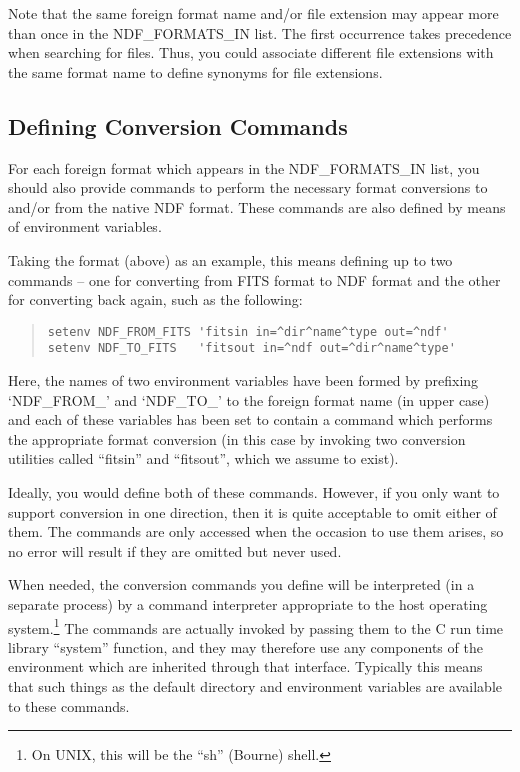 Note that the same foreign format name and/or file extension may
appear more than once in the NDF\_FORMATS\_IN list. The first
occurrence takes precedence when searching for files. Thus, you could
associate different file extensions with the same format name to
define synonyms for file extensions.

\subsection{\label{sect:conversioncommands}Defining Conversion Commands}

For each foreign format which appears in the NDF\_FORMATS\_IN list,
you should also provide commands to perform the necessary format
conversions to and/or from the native NDF format. These commands are
also defined by means of environment variables.

Taking the  format (above) as an
example, this means defining up to two commands -- one for converting
from FITS format to NDF format and the other for converting back
again, such as the following:

\begin{quote}
\begin{small}
\begin{verbatim}
setenv NDF_FROM_FITS 'fitsin in=^dir^name^type out=^ndf'
setenv NDF_TO_FITS   'fitsout in=^ndf out=^dir^name^type'
\end{verbatim}
\end{small}
\end{quote}

Here, the names of two environment variables have been formed by
prefixing `NDF\_FROM\_' and `NDF\_TO\_' to the foreign format name (in
upper case) and each of these variables has been set to contain a
command which performs the appropriate format conversion (in this case
by invoking two conversion utilities called ``fitsin'' and
``fitsout'', which we assume to exist).

Ideally, you would define both of these commands. However, if you only
want to support conversion in one direction, then it is quite
acceptable to omit either of them. The commands are only accessed when
the occasion to use them arises, so no error will result if they are
omitted but never used.

When needed, the conversion commands you define will be interpreted
(in a separate process) by a command interpreter appropriate to the
host operating system.\footnote{On UNIX, this will be the ``sh''
(Bourne) shell.} The commands are actually invoked by passing them to
the C run time library ``system'' function, and they may therefore use
any components of the environment which are inherited through that
interface. Typically this means that such things as the default
directory and environment variables are available to these commands.

